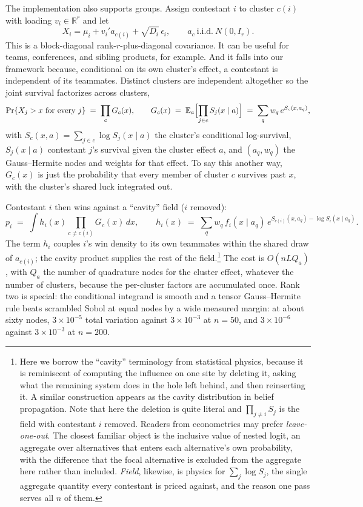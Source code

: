 \documentclass[11pt]{article}
\newcommand{\R}{\mathbb{R}}
\newcommand{\E}{\mathbb{E}}
\begin{document}
The implementation also supports groups. Assign contestant $i$ to cluster $c(i)$ with loading $v_i\in\R^r$ and let
\begin{equation}
X_i=\mu_i+v_i'a_{c(i)}+\sqrt{D_i}\,\epsilon_i,
\qquad a_c \ \text{i.i.d.}\ N(0,I_r).
\end{equation}
This is a block-diagonal rank-$r$-plus-diagonal covariance. It can be useful for teams, conferences, and sibling
products, for example. And it falls into our framework because, conditional on its own cluster's effect, a contestant is independent of its teammates. Distinct clusters are
independent altogether so the joint survival factorizes across clusters,
\begin{equation}\label{eq:blockfield}
\Pr\{X_j>x\ \text{for every } j\} \;=\; \prod_c G_c(x),
\qquad
G_c(x)\;=\;\E_a\Bigl[\prod_{j\in c} S_j(x\mid a)\Bigr]
       \;=\;\sum_q w_q\, e^{S_c(x,a_q)},
\end{equation}
with $S_c(x,a)=\sum_{j\in c}\log S_j(x\mid a)$ the cluster's conditional
log-survival, $S_j(x\mid a)$ contestant $j$'s survival given the cluster
effect $a$, and $(a_q,w_q)$ the Gauss--Hermite nodes and weights for that
effect. To say this another way, $G_c(x)$ is just the probability that every member of
cluster $c$ survives past $x$, with the cluster's shared luck integrated out.

Contestant $i$ then wins against a ``cavity'' field ($i$ removed):
\begin{equation}\label{eq:cavity}
p_i \;=\; \int h_i(x)\prod_{c\ne c(i)}G_c(x)\,dx,
\qquad
h_i(x) \;=\; \sum_q w_q\, f_i(x\mid a_q)\,e^{S_{c(i)}(x,a_q)-\log S_i(x\mid a_q)}.
\end{equation}
The term $h_i$ couples $i$'s win density to its own teammates within the shared
draw of $a_{c(i)}$; the cavity product supplies the rest of the field.\footnote{Here we borrow the ``cavity'' terminology from statistical physics, because it is reminiscent of computing the influence on one site by deleting it,
asking what the remaining system does in the hole left behind, and then
reinserting it. A similar construction appears as the cavity distribution
in belief propagation. Note that here the deletion is quite literal and $\prod_{j\ne i}S_j$
is the field with contestant $i$ removed. Readers from econometrics may
prefer \emph{leave-one-out}. The closest familiar object is the inclusive
value of nested logit, an aggregate over alternatives that enters each
alternative's own probability, with the difference that the focal
alternative is excluded from the aggregate here rather than included.
\emph{Field}, likewise, is physics for $\sum_j\log S_j$, the single
aggregate quantity every contestant is priced against, and the reason one
pass serves all $n$ of them.}
The cost
is $O(nLQ_a)$, with $Q_a$ the number of quadrature nodes for the cluster
effect, whatever the number of clusters, because the per-cluster factors
are accumulated once. Rank two is special: the conditional integrand is smooth
and a tensor Gauss--Hermite rule beats scrambled Sobol at equal nodes by a wide
measured margin: at about sixty nodes, $3\times10^{-5}$ total variation
against $3\times10^{-3}$ at $n=50$, and $3\times10^{-6}$ against
$3\times10^{-3}$ at $n=200$.
\end{document}
